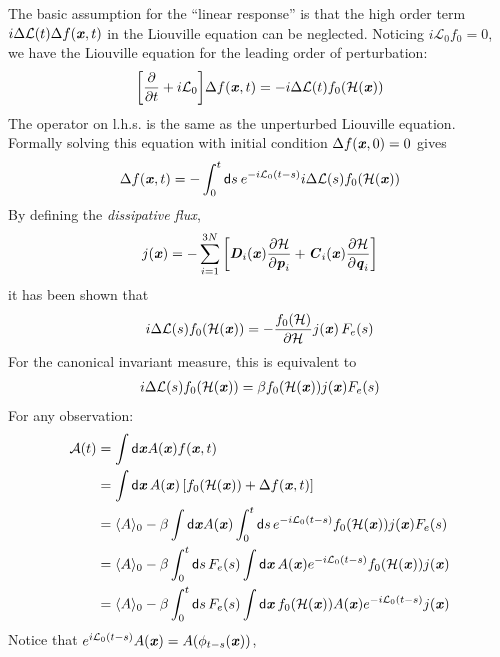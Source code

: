 \documentclass[aip,jcp,a4paper,reprint,onecolumn]{revtex4-1}
\newcommand{\vect}[1]{\textbf{\textit{#1}}}
\newcommand{\dd}{\textsf{d}}
\newcommand{\mh}{\mathcal H}
\newcommand{\ml}{\mathcal L}
\begin{document}
The basic assumption for the ``linear response'' is that the high order
term $i\Delta\ml(t)  \Delta  f(\vect x, t)$ in the Liouville equation
can be neglected. Noticing $i\ml_0 f_0 = 0$, we have the Liouville equation
for the leading order of perturbation:
\begin{align}
  \bigg[
  \frac{\partial}{\partial t}
  + i\ml_0
  \bigg]
  \Delta  f(\vect x, t)
  =
  - i\Delta\ml(t) f_0(\mh(\vect x))
\end{align}
The operator on l.h.s. is the same as the unperturbed Liouville equation.
Formally solving this equation with initial condition
$\Delta f(\vect x, 0) = 0$ gives
\begin{align}
  \Delta  f(\vect x, t) =
  - \int_0^t \dd s \:
  e^{-i\ml_0(t-s)}
  i\Delta\ml(s)f_0(\mh(\vect x))
\end{align}
By defining the \emph{dissipative flux},
\begin{align}
  j(\vect x) =
  -\sum_{i=1}^{3N}
  \bigg[
  \vect D_i(\vect x) \frac{\partial\mh}{\partial \vect p_i} +
  \vect C_i(\vect x) \frac{\partial\mh}{\partial \vect q_i}   
  \bigg]
\end{align}
it has been shown that~\cite{tuckeman2010statistical}
\begin{align}
  i\Delta\ml(s)f_0(\mh(\vect x)) =
  -\frac{f_0(\mh)}{\partial\mh} j(\vect x)\,F_e(s)
\end{align}
For the canonical invariant measure, this is equivalent to
\begin{align}
  i\Delta\ml(s)f_0(\mh(\vect x)) =
  \beta f_0(\mh(\vect x)) j(\vect x)F_e(s)
\end{align}
For any observation:
\begin{align}\nonumber
  \mathcal A(t)
  &=
  \int\dd \vect x A(\vect x)f(\vect x, t)  \\\nonumber
  &=
  \int\dd \vect x\, A(\vect x)\,
  [f_0(\mh(\vect x)) + \Delta f(\vect x, t)] \\\nonumber
  &=
  \langle A\rangle_0
  -
  \beta
  \int \dd \vect x
  A(\vect x)
  \int_0^t\dd s\,
  e^{-i\ml_0(t-s)}
  f_0(\mh(\vect x)) j(\vect x)F_e(s)  \\\nonumber
  &=
  \langle A\rangle_0
  -
  \beta
  \int_0^t\dd s\,
  F_e(s)
  \int \dd \vect x\,
  A(\vect x)
  e^{-i\ml_0(t-s)}
  f_0(\mh(\vect x)) j(\vect x)  \\
  &=
  \langle A\rangle_0
  -
  \beta
  \int_0^t\dd s\,
  F_e(s)
  \int \dd \vect x\,
  f_0(\mh(\vect x))
  A(\vect x)
  e^{-i\ml_0(t-s)}
  j(\vect x)  
\end{align}
Notice that $e^{i\ml_0(t-s)}A(\vect x) = A(\phi_{t-s}(\vect x))$,
\end{document}

